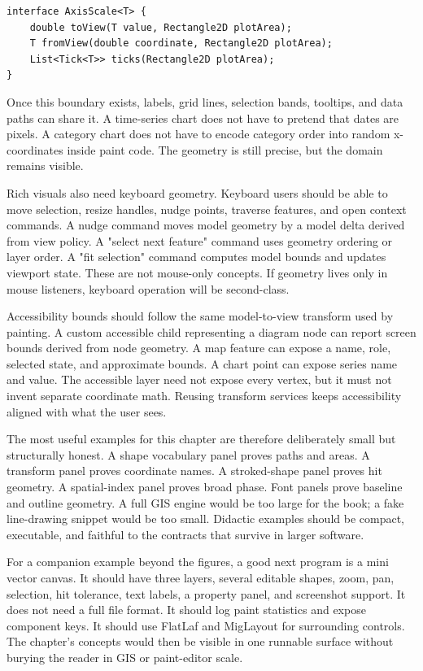 \begin{lstlisting}[caption={A chart scale is a geometry boundary above AffineTransform.}]
interface AxisScale<T> {
    double toView(T value, Rectangle2D plotArea);
    T fromView(double coordinate, Rectangle2D plotArea);
    List<Tick<T>> ticks(Rectangle2D plotArea);
}
\end{lstlisting}

Once this boundary exists, labels, grid lines, selection bands, tooltips, and data paths can share it. A time-series chart does not have to pretend that dates are pixels. A category chart does not have to encode category order into random x-coordinates inside paint code. The geometry is still precise, but the domain remains visible.

Rich visuals also need keyboard geometry. Keyboard users should be able to move selection, resize handles, nudge points, traverse features, and open context commands. A nudge command moves model geometry by a model delta derived from view policy. A "select next feature" command uses geometry ordering or layer order. A "fit selection" command computes model bounds and updates viewport state. These are not mouse-only concepts. If geometry lives only in mouse listeners, keyboard operation will be second-class.

Accessibility bounds should follow the same model-to-view transform used by painting. A custom accessible child representing a diagram node can report screen bounds derived from node geometry. A map feature can expose a name, role, selected state, and approximate bounds. A chart point can expose series name and value. The accessible layer need not expose every vertex, but it must not invent separate coordinate math. Reusing transform services keeps accessibility aligned with what the user sees.

The most useful examples for this chapter are therefore deliberately small but structurally honest. A shape vocabulary panel proves paths and areas. A transform panel proves coordinate names. A stroked-shape panel proves hit geometry. A spatial-index panel proves broad phase. Font panels prove baseline and outline geometry. A full GIS engine would be too large for the book; a fake line-drawing snippet would be too small. Didactic examples should be compact, executable, and faithful to the contracts that survive in larger software.

For a companion example beyond the figures, a good next program is a mini vector canvas. It should have three layers, several editable shapes, zoom, pan, selection, hit tolerance, text labels, a property panel, and screenshot support. It does not need a full file format. It should log paint statistics and expose component keys. It should use FlatLaf and MigLayout for surrounding controls. The chapter's concepts would then be visible in one runnable surface without burying the reader in GIS or paint-editor scale.

